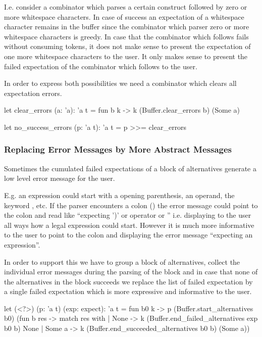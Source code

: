 I.e. consider a combinator which parses a certain construct followed by zero
or more whitespace characters. In case of success an expectation of a
whitespace character remains in the buffer since the combinator which parser
zero or more whitespace characters is greedy. In case that the combinator
which follows fails without consuming tokens, it does not make sense to present
the expectation of one more whitespace characters to the user. It only makes
sense to present the failed expectation of the combinator which follows to the
user.

In order to express both possibilities we need a combinator which clears all
expectation errors.

\begin{ocaml}
  let clear_errors (a: 'a): 'a t =
    fun b k -> k (Buffer.clear_errors b) (Some a)

  let no_success_errors (p: 'a t): 'a t =
    p >>= clear_errors
\end{ocaml}



\subsubsection{Replacing Error Messages by More Abstract Messages}


Sometimes the cumulated failed expectations of a block of alternatives
generate a low level error message for the user.

E.g. an expression could start with a opening parenthesis, an operand, the
keyword , etc. If the parser encounters a colon (\code{:}) the error
message could point to the colon and read like ``expecting ')' or operator or
'' i.e. displaying to the user all ways how a legal expression could
start. However it is much more informative to the user to point to the colon
and displaying the error message ``expecting an expression''.

In order to support this we have to group a block of alternatives, collect the
individual error messages during the parsing of the block and in case that
none of the alternatives in the block succeeds we replace the list of failed
expectation by a single failed expectation which is more expressive and
informative to the user.

\begin{ocaml}
  let (<?>) (p: 'a t) (exp: expect): 'a t =
    fun b0 k ->
      p (Buffer.start_alternatives b0)
        (fun b res ->
           match res with
           | None ->
               k (Buffer.end_failed_alternatives exp b0 b) None
           | Some a ->
               k (Buffer.end_succeeded_alternatives b0 b) (Some a))
\end{ocaml}



